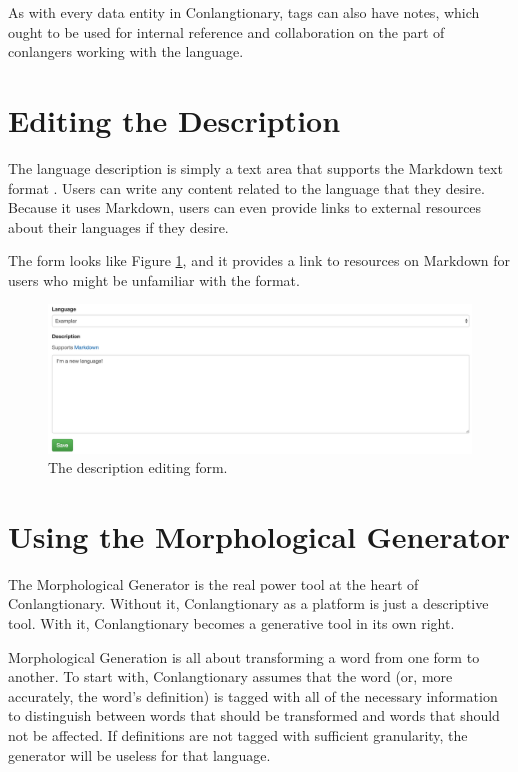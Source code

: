 As with every data entity in Conlangtionary, tags can also have notes, which ought to be used for internal reference and collaboration on the part of conlangers working with the language.

\section{Editing the Description}
\label{sec:edit-description}

The language description is simply a text area that supports the Markdown text format \cite{Markdown}. Users can write any content related to the language that they desire. Because it uses Markdown, users can even provide links to external resources about their languages if they desire.

The form looks like Figure \ref{fig:edit-description}, and it provides a link to resources on Markdown for users who might be unfamiliar with the format.

\begin{figure}[h]
\includegraphics[width=\textwidth]{figures/edit-description}
\caption{The description editing form.}
\centering
\label{fig:edit-description}
\end{figure}

\section{Using the Morphological Generator}
\label{sec:using-morph-gen}

The Morphological Generator is the real power tool at the heart of Conlangtionary. Without it, Conlangtionary as a platform is just a descriptive tool. With it, Conlangtionary becomes a generative tool in its own right.

Morphological Generation is all about transforming a word from one form to another. To start with, Conlangtionary assumes that the word (or, more accurately, the word's definition) is tagged with all of the necessary information to distinguish between words that should be transformed and words that should not be affected. If definitions are not tagged with sufficient granularity, the generator will be useless for that language.

